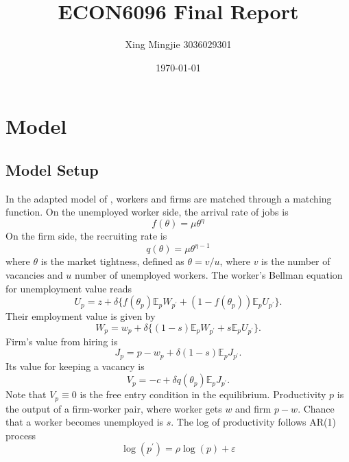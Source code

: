 \documentclass[10pt]{article} %
\title{ECON6096 Final Report\\
\cite{Shimer2005}}
\author{Xing Mingjie 3036029301}
\date{\today} %
\begin{document}
\maketitle
\section{Model}
\subsection{Model Setup}
    In the adapted model of \cite{Shimer2005}, workers and firms are matched through a matching function.\newline
    On the unemployed worker side, the arrival rate of jobs is 
    \[f(\theta) = \mu \theta^\eta\]
    On the firm side, the recruiting rate is
    \[q(\theta) = \mu \theta^{\eta-1}\]
    where \(\theta\) is the market tightness, defined as \(\theta = v/u\), where \(v\) is the number of vacancies and \(u\) number of unemployed workers.\newline
    The worker's Bellman equation for unemployment value reads 
    \begin{equation}\label{BellmanUnemploy}
        U_p = z + \delta \{f(\theta_p)\mathbb{E}_p W_{p^\prime} + (1-f(\theta_p))\mathbb{E}_p U_{p^\prime}\}.
    \end{equation}
    Their employment value is given by 
    \begin{equation}\label{BellmanEmploy}
        W_p = w_p + \delta \{(1-s)\mathbb{E}_p W_{p^\prime} + s\mathbb{E}_p U_{p^\prime}\}.
    \end{equation}
    Firm's value from hiring is 
    \begin{equation}\label{BellmanHire}
        J_p = p - w_p + \delta (1-s)\mathbb{E}_p J_{p^\prime}.
    \end{equation}
    Its value for keeping a vacancy is 
    \begin{equation}\label{BellmanVacancy}
        V_p = -c + \delta q(\theta_p)\mathbb{E}_p J_{p^\prime}.
    \end{equation}
    Note that \(V_p  \equiv 0 \) is the free entry condition in the equilibrium.\newline
    Productivity \(p\) is the output of a firm-worker pair, where worker gets \(w\) and firm \(p-w\). Chance that a worker becomes unemployed is \(s\).\newline
    The log of productivity follows AR(1) process 
    \begin{equation}\label{productivityprocess}
        \log(p^\prime) = \rho \log(p) + \varepsilon 
        \end{equation}
\end{document}
